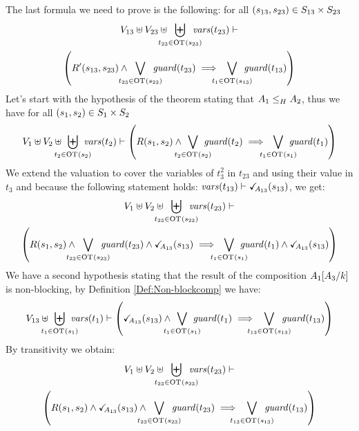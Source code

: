 \documentclass[runningheads]{llncs}
\begin{document}
\item The last formula we need to prove is the following: for all $\mpar{s_{13}, s_{23}} \in S_{13} \times S_{23}$
\begin{multline*}
V_{13} \uplus V_{23} \uplus \biguplus_\subbox{t_{23}\in \fOT{s_{23}}} \fvars{t_{23}} \vdash \\ \left(R^{\prime}\mpar{s_{13}, s_{23}} \wedge \bigvee_\subbox{t_{23} \in \fOT{s_{23}}} \fguard{t_{23}} \implies \bigvee_\subbox{t_1 \in \fOT{s_{13}}} \fguard{t_{13}} \right)
\end{multline*}
Let's start  with the hypothesis of the theorem stating that $\wrel{A_1}{A_2}{H}$, thus we have for all  $\mpar{s_1, s_2} \in S_1 \times S_2$ 
\begin{multline*}
V_1 \uplus V_2 \uplus \biguplus_\subbox{t_2 \in \fOT{s_2}} \fvars{t_2} \vdash \left(R\mpar{s_1, s_2} \wedge \bigvee_\subbox{t_2 \in \fOT{s_2}} \fguard{t_2} \implies \bigvee_\subbox{t_1 \in \fOT{s_1}} \fguard{t_1} \right)
\end{multline*}
We extend the valuation to cover the variables of  $t^2_3$ in $t_{23}$ and using their value in $t_3$ and because the following statement holds: $\fvars{t_{13}} \vdash \reach{A_{13}}\mpar{s_{13}}$, we get:
\begin{multline*}
V_1 \uplus V_2 \uplus \biguplus_\subbox{t_{23} \in \fOT{s_{23}}} \fvars{t_{23}} \vdash\\ \left(R\mpar{s_1, s_2} \wedge \bigvee_\subbox{t_{23} \in \fOT{s_{23}}} \fguard{t_{23}}  \wedge \reach{A_{13}}\mpar{s_{13}} \implies \bigvee_\subbox{t_1 \in \fOT{s_1}} \fguard{t_1}   \wedge \reach{A_{13}}\mpar{s_{13}}\right)
\end{multline*}
We have a second hypothesis stating that the result of the composition \(A_1\subst{A_3}{k}\) is non-blocking, by Definition \ref{Def:Non-blockcomp} we have:
\begin{multline*}
V_{13}  \uplus \biguplus_\subbox{t_1 \in \fOT{s_1}} \fvars{t_1} \vdash \left( \reach{A_{13}}\mpar{s_{13}} \wedge \bigvee_\subbox{t_1 \in \fOT{s_1}} \fguard{t_1} \implies \bigvee_\subbox{t_{13} \in \fOT{s_{13}}} \fguard{t_{13}} \right)
\end{multline*}
By transitivity  we obtain:
\begin{multline*}
V_1 \uplus V_2 \uplus \biguplus_\subbox{t_{23} \in \fOT{s_{23}}} \fvars{t_{23}} \vdash\\ \left(R\mpar{s_1, s_2} \wedge \reach{A_{13}}\mpar{s_{13}} \wedge \bigvee_\subbox{t_{23} \in \fOT{s_{23}}} \fguard{t_{23}}   \implies \bigvee_\subbox{t_{13} \in \fOT{s_{13}}} \fguard{t_{13}}\right)
\end{multline*}
\end{document}
